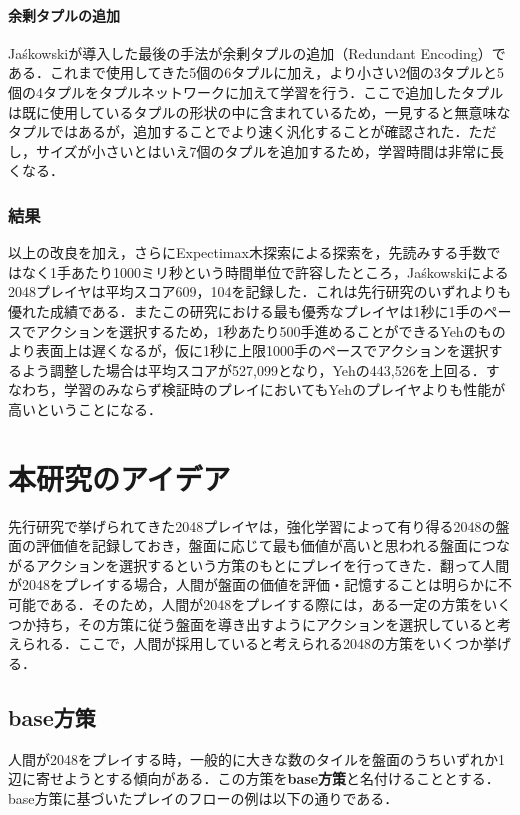 \documentclass{suribt}
\begin{document}
\subsubsection{余剰タプルの追加}
Ja\'{s}kowskiが導入した最後の手法が余剰タプルの追加（Redundant Encoding）である．これまで使用してきた5個の6タプルに加え，より小さい2個の3タプルと5個の4タプルをタプルネットワークに加えて学習を行う．ここで追加したタプルは既に使用しているタプルの形状の中に含まれているため，一見すると無意味なタプルではあるが，追加することでより速く汎化することが確認された．ただし，サイズが小さいとはいえ7個のタプルを追加するため，学習時間は非常に長くなる．

\subsection{結果}
以上の改良を加え，さらにExpectimax木探索による探索を，先読みする手数ではなく1手あたり1000ミリ秒という時間単位で許容したところ，Ja\'{s}kowskiによる2048プレイヤは平均スコア609，104を記録した．これは先行研究のいずれよりも優れた成績である．またこの研究における最も優秀なプレイヤは1秒に1手のペースでアクションを選択するため，1秒あたり500手進めることができるYehのものより表面上は遅くなるが，仮に1秒に上限1000手のペースでアクションを選択するよう調整した場合は平均スコアが527,099となり，Yehの443,526を上回る．すなわち，学習のみならず検証時のプレイにおいてもYehのプレイヤよりも性能が高いということになる．

\chapter{本研究のアイデア}
先行研究で挙げられてきた2048プレイヤは，強化学習によって有り得る2048の盤面の評価値を記録しておき，盤面に応じて最も価値が高いと思われる盤面につながるアクションを選択するという方策のもとにプレイを行ってきた．翻って人間が2048をプレイする場合，人間が盤面の価値を評価・記憶することは明らかに不可能である．そのため，人間が2048をプレイする際には，ある一定の方策をいくつか持ち，その方策に従う盤面を導き出すようにアクションを選択していると考えられる．ここで，人間が採用していると考えられる2048の方策をいくつか挙げる．

\section{base方策}
人間が2048をプレイする時，一般的に大きな数のタイルを盤面のうちいずれか1辺に寄せようとする傾向がある．この方策を\textbf{base方策}と名付けることとする．base方策に基づいたプレイのフローの例は以下の通りである．
\end{document}
